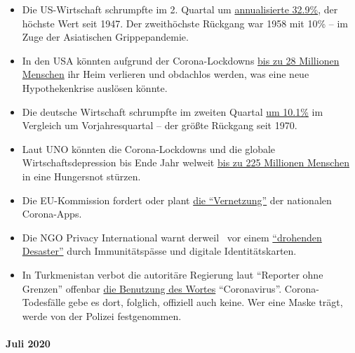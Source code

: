 \begin{itemize}
\tightlist
\item
  Die US-Wirtschaft schrumpfte im 2. Quartal um
  \href{https://www.axios.com/us-gdp-q2-coronavirus-contraction-worst-ever-ed533bbf-1113-47fa-aee2-6e66fb553977.html}{annualisierte
  32.9\%}, der höchste Wert seit 1947. Der zweithöchste Rückgang war
  1958 mit 10\% -- im Zuge der Asiatischen Grippepandemie.
\item
  In den USA könnten aufgrund der Corona-Lockdowns
  \href{https://www.cnbc.com/2020/07/10/looming-evictions-may-soon-make-28-million-homeless-expert-says.html}{bis
  zu 28 Millionen Menschen} ihr Heim verlieren und obdachlos werden, was
  eine neue Hypothekenkrise auslösen könnte.
\item
  Die deutsche Wirtschaft schrumpfte im zweiten Quartal
  \href{https://www.marketwatch.com/story/german-gdp-slumps-by-most-since-1970-in-the-second-quarter-11596096434}{um
  10.1\%} im Vergleich um Vorjahresquartal -- der größte Rückgang seit
  1970.
\item
  Laut UNO könnten die Corona-Lockdowns und die globale
  Wirtschaftsdepression bis Ende Jahr welweit
  \href{https://www.telegraph.co.uk/global-health/climate-and-people/coronavirus-set-trigger-brutal-tragedies-fragile-countries-un/}{bis
  zu 225 Millionen Menschen} in eine Hungersnot stürzen.
\item
  Die EU-Kommission fordert oder plant
  \href{https://corona-transition.org/eu-kommission-will-alle-nationalen-corona-warn-apps-vernetzen}{die
  ``Vernetzung''} der nationalen Corona-Apps.
\item
  Die NGO Privacy International warnt derweil~ vor einem
  \href{https://privacyinternational.org/long-read/4074/looming-disaster-immunity-passports-and-digital-identity}{``drohenden
  Desaster''} durch Immunitätspässe und digitale Identitätskarten.
\item
  In Turkmenistan verbot die autoritäre Regierung laut ``Reporter ohne
  Grenzen'' offenbar
  \href{https://www.npr.org/sections/coronavirus-live-updates/2020/03/31/824611607/turkmenistan-has-banned-use-of-the-word-coronavirus}{die
  Benutzung des Wortes} ``Coronavirus''. Corona-Todesfälle gebe es dort,
  folglich, offiziell auch keine. Wer eine Maske trägt, werde von der
  Polizei festgenommen.
\end{itemize}

\hypertarget{juli-2020}{%
\paragraph{Juli 2020}\label{juli-2020}}

